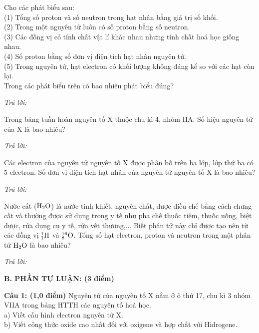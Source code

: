 \documentclass[11pt,a4paper]{article}
\begin{document}
\begin{ex}
Cho các phát biểu sau:\\
(1) Tổng số proton và số neutron trong hạt nhân bằng giá trị số khối.\\
(2) Trong một nguyên tử luôn có số proton bằng số neutron.\\
(3) Các đồng vị có tính chất vật lí khác nhau nhưng tính chất hoá học giống nhau.\\
(4) Số proton bằng số đơn vị điện tích hạt nhân nguyên tử.\\
(5) Trong nguyên tử, hạt electron có khối lượng không đáng kể so với các hạt còn lại.\\
Trong các phát biểu trên có bao nhiêu phát biểu đúng?

\noindent\textit{Trả lời:} \dotfill
\end{ex}
\begin{ex}
Trong bảng tuần hoàn nguyên tố X thuộc chu kì 4, nhóm IIA. Số hiệu nguyên tử của X là bao nhiêu?

\noindent\textit{Trả lời:} \dotfill
\end{ex}
\begin{ex}
Các electron của nguyên tử nguyên tố X được phân bố trên ba lớp, lớp thứ ba có 5 electron. Số đơn vị điện tích hạt nhân của nguyên tử nguyên tố X là bao nhiêu?

\noindent\textit{Trả lời:} \dotfill
\end{ex}
\begin{ex}
Nước cất ($\ce{H2O}$) là nước tinh khiết, nguyên chất, được điều chế bằng cách chưng cất và thường được sử dụng trong y tế như pha chế thuốc tiêm, thuốc uống, biệt dược, rửa dụng cụ y tế, rửa vết thương,... Biết phân tử này chỉ được tạo nên từ các đồng vị $^1_1\ce{H}$ và $^{16}_8\ce{O}$. Tổng số hạt electron, proton và neutron trong một phân tử $\ce{H2O}$ là bao nhiêu?

\noindent\textit{Trả lời:} \dotfill
\end{ex}
\vspace{6pt}
\noindent
{\color{mainGreen}\textbf{\Large B. PHẦN TỰ LUẬN: (3 điểm)}}
\vspace{2pt}

\noindent
\textbf{Câu 1: (1,0 điểm)} Nguyên tử của nguyên tố X nằm ở ô thứ 17, chu kì 3 nhóm VIIA trong bảng HTTH các nguyên tố hoá học.\\
a) Viết cấu hình electron nguyên tử X.\\
b) Viết công thức oxide cao nhất đối với oxigene và hợp chất với Hidrogene.
\end{document}
